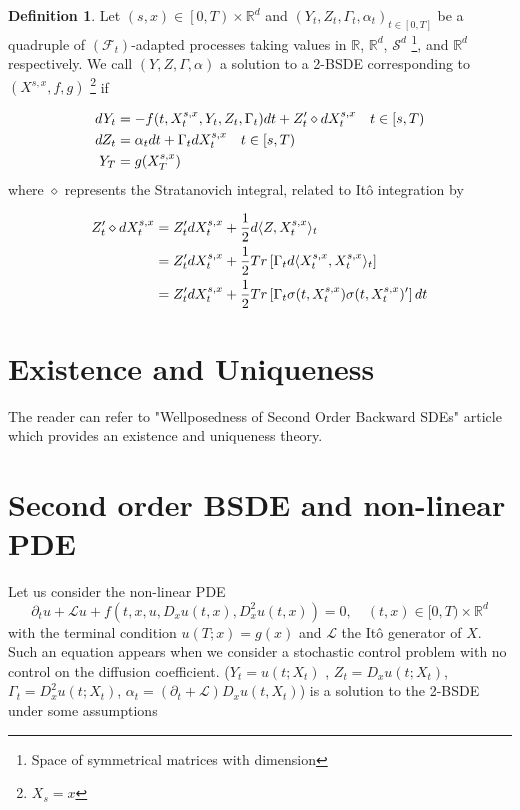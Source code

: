 \documentclass[english,11pt,openany]{report}
\theoremstyle{definition}
\newtheorem{defn}{Definition}[section]
\newcommand{\R}{\mathbb{R}}
\theoremstyle{plain}
\theoremstyle{definition}
\begin{document}
\begin{defn}
Let $(s, x) \in \left[0, T\right) \times\R^d$ and $(Y_t, Z_t, \Gamma_t, \alpha_t)_{t\in [0, T]}$ be a quadruple of $(\mathcal{F}_t)$-adapted processes taking values in $\R$, $\R^d$, $\mathcal{S}^d$ \footnote{Space of symmetrical matrices with dimension}, and $\R^d$ respectively. We call $(Y, Z, \Gamma, \alpha)$ a solution to a 2-BSDE corresponding to $(X^{s,x}, f, g)$ \footnote{$X_s = x$} if
	
\begin{align} \label{2-BSDE}
dY_t &= - f(t,X_t^{s,x}, Y_t,Z_t, \Gamma_t)dt + Z_t' \diamond dX_t^{s,x} \quad t\in [s, T)\\
dZ_t &= \alpha_tdt + \Gamma_t dX_t^{s,x} \quad t\in [s, T) \notag\\
Y_T & = g(X_T^{s,x}) \notag
\end{align}
where $\diamond$ represents the Stratanovich integral, related to Itô integration by 

\begin{align}
Z_t' \diamond dX_t^{s,x} &= Z_t' dX_t^{s,x} + \frac{1}{2}d\langle Z, X_t^{s,x}\rangle_t \notag \\
&= Z_t' dX_t^{s,x} + \frac{1}{2}Tr\left[\Gamma_t d\langle X_t^{s,x}, X_t^{s,x}\rangle_t \right] \notag \\
& = Z_t' dX_t^{s,x} + \frac{1}{2}Tr\left[\Gamma_t \sigma(t, X_t^{s,x})\sigma(t, X_t^{s,x})' \right]dt \notag
\end{align}

\end{defn}

\section{Existence and Uniqueness}

The reader can refer to "Wellposedness of Second Order Backward SDEs" \cite{touzi:2BSDE} article which provides an existence and uniqueness theory. 

\section{Second order BSDE and non-linear PDE}

Let us consider the non-linear PDE 
\begin{equation}\label{eq:nonlinearpde}
\partial_t u + \mathcal{L}u + f(t, x, u, D_xu(t,x), D^2_xu(t,x)) = 0, \quad (t,x)\in [0, T) \times \mathbb{R}^d
\end{equation}
with the terminal condition $u(T; x) = g(x)$ and $\mathcal{L}$ the Itô generator of $X$.
Such an equation appears when we consider a stochastic control problem
with no control on the diffusion coefficient. 
($Y_t = u(t;X_t)$ , $Z_t =D_xu(t;X_t)$, $\Gamma_t = D^2_xu(t;X_t)$, $\alpha_t = (\partial_t + \mathcal{L})D_xu(t,X_t)$) is a solution to the 2-BSDE under some assumptions
\end{document}
